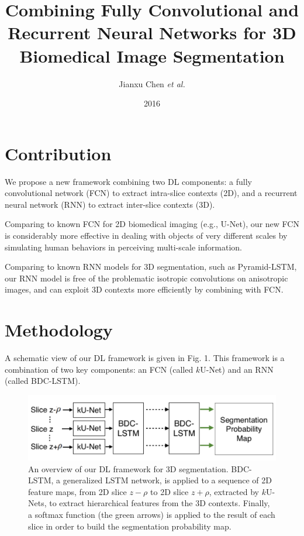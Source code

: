 \documentclass[a4paper,12pt]{article}
\title{Combining Fully Convolutional and Recurrent Neural Networks for 3D Biomedical Image Segmentation}
\author{Jianxu Chen \emph{et al.}}
\date{2016}
\begin{document}
\maketitle

\section{Contribution}

We propose a new framework combining two DL components: a fully convolutional network (FCN) to extract intra-slice contexts (2D), and a recurrent neural network (RNN) to extract inter-slice contexts (3D).

Comparing to known FCN for 2D biomedical imaging (e.g., U-Net), our new FCN is considerably more effective in dealing with objects of very different scales by simulating human behaviors in perceiving multi-scale information.

Comparing to known RNN models for 3D segmentation, such as Pyramid-LSTM, our RNN model is free of the problematic isotropic convolutions on anisotropic images, and can exploit 3D contexts more efficiently by combining with FCN.

\section{Methodology}

A schematic view of our DL framework is given in Fig. 1. This framework is a combination of two key components: an FCN (called $k$U-Net) and an RNN (called BDC-LSTM).

\begin{figure}[ht]
    \includegraphics[width=\columnwidth]{img/overview.png}
    \caption{An overview of our DL framework for 3D segmentation. BDC-LSTM, a generalized LSTM network, is applied to a sequence of 2D feature maps, from 2D slice $z - \rho$ to 2D slice $z + \rho$, extracted by $k$U-Nets, to extract hierarchical features from the 3D contexts. Finally, a softmax function (the green arrows) is applied to the result of each slice in order to build the segmentation probability map.}
\end{figure}
\end{document}
